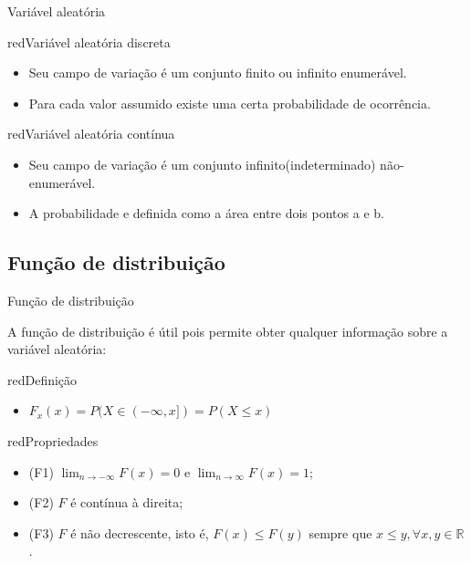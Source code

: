 \documentclass[9pt]{beamer}
\begin{document}
\begin{frame}{Variável aleatória}{}

\begin{block}{red}{Variável aleatória discreta}
\begin{itemize}
\item Seu campo de variação é um conjunto finito ou infinito enumerável.
\item Para cada valor assumido existe uma certa probabilidade de ocorrência.
\end{itemize}
\end{block}




\begin{block}{red}{Variável aleatória contínua}
\begin{itemize}
\item Seu campo de variação é um conjunto infinito(indeterminado) não-
enumerável.
\item A probabilidade e definida como a área entre dois pontos a e b.
\end{itemize}
\end{block}
\end{frame}

\subsection{Função de distribuição}
\begin{frame}{Função de distribuição}{}

A função de distribuição é útil pois permite
obter qualquer informação sobre a variável aleatória:


\begin{block}{red}{Definição}{}
\begin{itemize}
\item $F_x(x) = P(X \in (-\infty, x]) = P(X \leq x)$
\end{itemize}
\end{block}

\begin{block}{red}{Propriedades}{}
\begin{itemize}
\item (F1) $\lim_{n \to -\infty}F(x) = 0$ e $\lim_{n \to \infty} F(x) =
  1$;
\item (F2) $F$ é contínua à direita;
\item (F3) $F$ é não decrescente, isto é, $F(x) \leq F(y)$ sempre que $x
  \leq y, \forall x, y \in \mathbb{R}$.
\end{itemize}
\end{block}

\end{frame}
\end{document}
